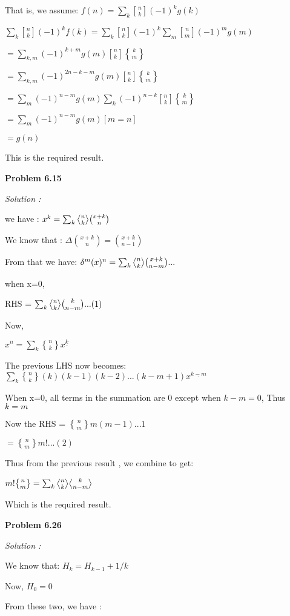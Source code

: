 \documentclass[12pt]{article}
\def \bangle{ \atopwithdelims \langle \rangle}
\begin{document}
That is, we assume: $f(n) = \sum_k{{n \brack k}(-1)^kg(k)}$

$\sum_k{{n \brack k}(-1)^kf(k)} = \sum_k{n \brack k}(-1)^k{\sum_m{{n \brack m}}(-1)^mg(m)}$

$= \sum_{k,m}{(-1)^{k+m}g(m){n \brack k}{k \brace m}}$

$= \sum_{k,m}{(-1)^{2n-k-m}g(m){n \brack k}{k \brace m}}$

$= \sum_{m}{(-1)^{n-m}g(m)\sum_{k}{(-1)^{n-k}}{n \brack k}{k \brace m}}$

$ = \sum_{m} {(-1)^{n-m}g(m)[m=n]}$

$= g(n)$

This is the required result.

\medskip

\medskip

\noindent
{\bf Problem 6.15}

\textit {Solution :}

we have : $x^k = \sum_{k}^{}{n \bangle k}{x+k \choose n}$

We know that : $\Delta {x+k \choose n} = {x+k \choose n-1}$

From that we have: ${\delta}^m(x)^n = \sum_{k}{n \bangle k}{x+k \choose n-m}...$

when x=0,

RHS = $\sum_{k} {n \bangle k}{k \choose n-m}...(1)$

Now,

$x^n = \sum_{k} {n \brace k}{x^{\underline{k}}}$

The previous LHS now becomes: $\sum_{k}{n \brace k}(k)(k-1)(k-2)...(k-m+1){x}^{\underline{k-m}}$

When x=0, all terms in the summation are 0 except when $k-m=0$, Thus $k=m$

Now the RHS = ${n \brace m}m(m-1)...1$

$={n \brace m}m!...(2)$

Thus from the previous result , we combine to get:

$m!{n \brace m} = \sum_k{n \bangle k}{k \bangle n-m}$

Which is the required result.

\medskip

\medskip

\noindent
{\bf Problem 6.26}

\textit {Solution :}

We know that: $H_k = H_{k-1} + 1/k$

Now, $H_0 = 0$

From these two, we have :
\end{document}
